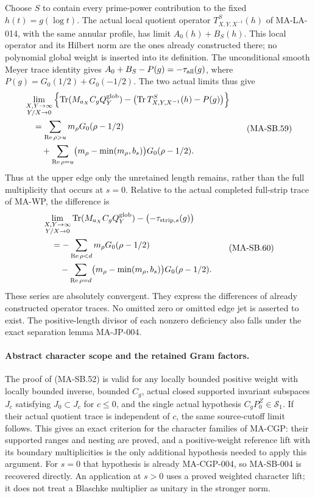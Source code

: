 Choose $S$ to contain every prime-power contribution
to the fixed $h(t)=g(\log t)$.
The actual local quotient operator
$T^S_{X,Y,X^{-1}}(h)$ of MA-LA-014, with the
same annular profile, has limit $A_0(h)+B_S(h)$.
This local operator and its Hilbert norm are the
ones already constructed there; no polynomial
global weight is inserted into its definition.
The unconditional smooth Meyer trace identity
gives $A_0+B_S-P(g)=-\tau_{\rm all}(g)$, where
$P(g)=G_0(1/2)+G_0(-1/2)$.
The two actual limits thus give
\[
 \begin{split}
 &\lim_{\substack{X,Y\to\infty\\Y/X\to0}}
 \left\{\operatorname{Tr}(M_{a_X}C_gQ_Y^{\rm glob})
       -\bigl(\operatorname{Tr}T^S_{X,Y,X^{-1}}(h)-P(g)\bigr)\right\}\\
 &\quad=
   \sum_{\operatorname{Re}\rho>u}m_\rho G_0(\rho-1/2)\\
 &\qquad+\sum_{\operatorname{Re}\rho=u}
      \bigl(m_\rho-\min(m_\rho,b_s)\bigr)G_0(\rho-1/2).
 \end{split}
 \tag{MA-SB.59}
\]
Thus at the upper edge only the unretained
length remains, rather than the full multiplicity
that occurs at $s=0$.
Relative to the actual completed full-strip
trace of MA-WP, the difference is
\[
 \begin{split}
 &\lim_{\substack{X,Y\to\infty\\Y/X\to0}}
       \operatorname{Tr}(M_{a_X}C_gQ_Y^{\rm glob})
                       -\bigl(-\tau_{{\rm strip},s}(g)\bigr)\\
 &\quad=-\sum_{\operatorname{Re}\rho<d}
                         m_\rho G_0(\rho-1/2)\\
 &\qquad-\sum_{\operatorname{Re}\rho=d}
      \bigl(m_\rho-\min(m_\rho,b_s)\bigr)G_0(\rho-1/2).
 \end{split}
 \tag{MA-SB.60}
\]
These series are absolutely convergent.
They express the differences of already constructed
operator traces.  No omitted zero or omitted edge
jet is asserted to exist.
The positive-length divisor of each nonzero deficiency
also falls under the exact separation lemma MA-JP-004.

\paragraph{Abstract character scope and the retained Gram factors.}
The proof of (MA-SB.52) is valid for any locally
bounded positive weight with locally bounded inverse,
bounded $C_g$, actual closed supported invariant subspaces
$J_c$ satisfying $J_0\subset J_c$ for $c\le0$,
and the single actual hypothesis
$C_gP_0^Z\in\mathcal S_1$.
If their actual quotient trace is independent of
$c$, the same source-cutoff limit follows.
This gives an exact criterion for the character
families of MA-CGP: their supported ranges and
nesting are proved, and a positive-weight reference
lift with its boundary multiplicities is the only
additional hypothesis needed to apply this argument.
For $s=0$ that hypothesis is already MA-CGP-004,
so MA-SB-004 is recovered directly.
An application at $s>0$ uses a proved weighted
character lift; it does not treat a Blaschke
multiplier as unitary in the stronger norm.

